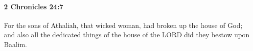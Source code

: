 
		\paragraph{2 Chronicles 24:7} %
			\label{2CHRONICLES-24-7}

			For the sons of Athaliah, that wicked woman, had broken up the house of God; and also all the dedicated things of the house of the LORD did they bestow upon Baalim.


